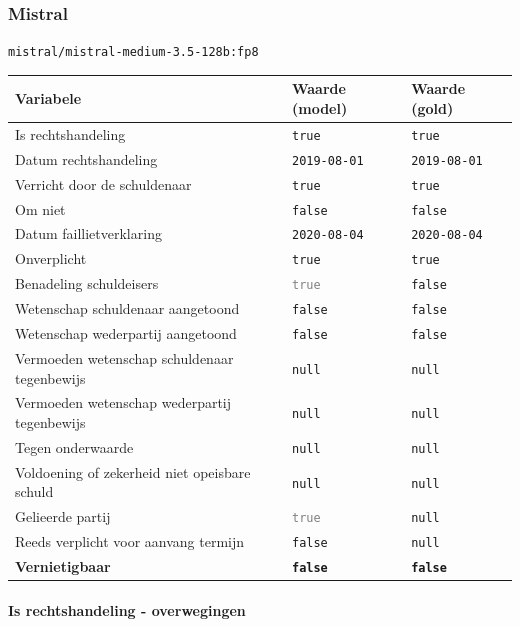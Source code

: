 \documentclass[
  dutch,
  a4paper,
]{article}
\begin{document}
\subsubsection{Mistral}\label{mistral-13}

\texttt{mistral/mistral-medium-3.5-128b:fp8}

\begin{center}
\small
\begin{tabular}{@{}p{7.4cm}p{2.6cm}p{2.6cm}@{}}
\toprule
Variabele & Waarde (model) & Waarde (gold) \\
\midrule
Is rechtshandeling & \texttt{true} & \texttt{true} \\
Datum rechtshandeling & \texttt{2019-08-01} & \texttt{2019-08-01} \\
Verricht door de schuldenaar & \texttt{true} & \texttt{true} \\
Om niet & \texttt{false} & \texttt{false} \\
Datum faillietverklaring & \texttt{2020-08-04} & \texttt{2020-08-04} \\
Onverplicht & \texttt{true} & \texttt{true} \\
Benadeling schuldeisers & \textcolor{gray}{\texttt{true}} & \texttt{false} \\
Wetenschap schuldenaar aangetoond & \texttt{false} & \texttt{false} \\
Wetenschap wederpartij aangetoond & \texttt{false} & \texttt{false} \\
Vermoeden wetenschap schuldenaar tegenbewijs & \texttt{null} & \texttt{null} \\
Vermoeden wetenschap wederpartij tegenbewijs & \texttt{null} & \texttt{null} \\
Tegen onderwaarde & \texttt{null} & \texttt{null} \\
Voldoening of zekerheid niet opeisbare schuld & \texttt{null} & \texttt{null} \\
Gelieerde partij & \textcolor{gray}{\texttt{true}} & \texttt{null} \\
Reeds verplicht voor aanvang termijn & \texttt{false} & \texttt{null} \\
\textbf{Vernietigbaar} & \textbf{\texttt{false}} & \textbf{\texttt{false}} \\
\bottomrule
\end{tabular}
\end{center}

\paragraph{Is rechtshandeling - overwegingen}\label{is-rechtshandeling---overwegingen-39}
\end{document}
